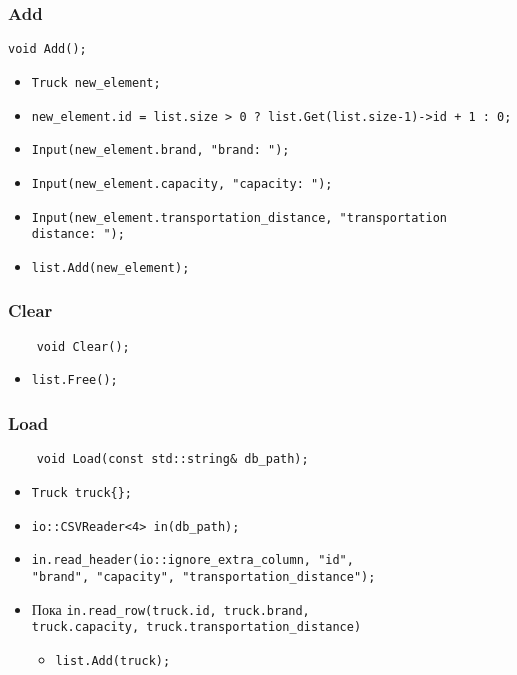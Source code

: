 \subsubsection*{Add}

\begin{lstlisting}
void Add();
\end{lstlisting}

\begin{itemize}
	\item \verb|Truck new_element;|
	\item \verb|new_element.id = list.size > 0 ? list.Get(list.size-1)->id + 1 : 0;|
	\item \verb|Input(new_element.brand, "brand: ");|
	\item \verb|Input(new_element.capacity, "capacity: ");|
	\item \verb|Input(new_element.transportation_distance, "transportation distance: ");|
	\item \verb|list.Add(new_element);|
\end{itemize}


\subsubsection*{Clear}

\begin{lstlisting}
	void Clear();
\end{lstlisting}

\begin{itemize}
	\item \verb|list.Free();|
\end{itemize}


\subsubsection*{Load}

\begin{lstlisting}
	void Load(const std::string& db_path);
\end{lstlisting}

\begin{itemize}
	\item \verb|Truck truck{};|
	\item \verb|io::CSVReader<4> in(db_path);|
	\item \verb|in.read_header(io::ignore_extra_column, "id",|\\
	\verb|"brand", "capacity", "transportation_distance");|
	\item Пока \verb|in.read_row(truck.id, truck.brand,|\\ 
	\verb|truck.capacity, truck.transportation_distance)|
	\begin{itemize}
		\item \verb|list.Add(truck);|
	\end{itemize}
\end{itemize}


